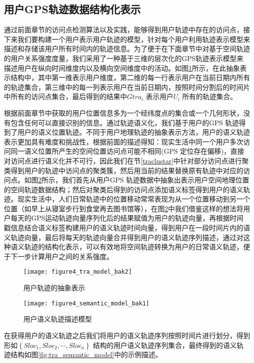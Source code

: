 \subsection{用户GPS轨迹数据结构化表示}
\label{sec:section3-4}
通过前面章节的访问点检测算法以及实践，能够得到用户轨迹中存在的访问点，接下来我们要构建一个用户表示用户轨迹的模型，针对每个用户利用轨迹表示模型来描述和存储该用户所有时间内的轨迹信息。为了便于在下面章节中对基于空间轨迹的用户关系强度度量，我们采用了一种基于三维的层次化的GPS轨迹表示模型来描述用户在纵向时间维度内以及横向空间维度中的活动。如图\ref{fig:tramodel_abstract}所示，在此抽象表示结构中，其中第一维表示用户维度，第二维的每一行表示用户在当前日期内所有的轨迹集合，第三维中的每一列表示用户在当前日期内，按照时间分割后的时间片中所有的访问点集合，最后得到的结果中$Gtra_{i}$ 表示用户$U_{i}$ 所有的轨迹集合。
\par 根据前面章节中获取的用户位置信息多为一个经纬度点的集合或一个几何形状，没有包含任何可以直接识别的信息。通过轨迹语义化，我们基于用户的GPS 轨迹得到了用户的语义位置轨迹。不同于用户地理轨迹的抽象表示方法，用户的语义轨迹表示更加具有难度和挑战性，根据前面的描述得知：现实生活中同一个用户多次访问同一语义位置所产生的空间位置访问点可能不相同(GPS 定位存在偏移)，直接对访问点进行语义化并不可行，因此我们在节\ref{traclustar}中针对部分访问点进行聚类得到用户的轨迹中访问点的聚类簇，然后用当前的结果替换原有轨迹中对应的访问点。如图\ref{fig:semantic_model}所示，我们首先从用户GPS 轨迹数据中抽象出表示用户空间地理位置的空间轨迹数据结构；然后对聚类后得到的访问点添加语义标签得到用户的语义轨迹。现实生活中，人们日常轨迹中的位置移动常常表现为从一个位置移动到另一个位置（如早上从寝室步行到食堂再去图书馆等），在图\ref{fig:semantic_model}中我们借鉴这样的想法将用户每天的GPS运动轨迹向量序列化后的结果赋值为用户的轨迹向量，再根据时间戳信息结合语义标签构建用户的语义轨迹时间向量，得到用户在一段时间片内的语义轨迹向量，最后将每天的轨迹向量合并得到用户的语义轨迹序列描述，通过对这种语义轨迹的结构化表示，可以有效地将空间轨迹转换为用户的日常语义轨迹，便于下一步计算用户之间的关系强度。
\begin{figure}[htp]
\centering
\texttt{[image: figure4\_tra\_model\_bak2]}
\caption{用户轨迹的抽象表示}
\label{fig:tramodel_abstract}
\end{figure}
\begin{figure}[htp]
\centering
\texttt{[image: figure4\_semantic\_model\_bak1]}
\caption{用户语义轨迹描述模型}
\label{fig:semantic_model}
\end{figure}
\par 在获得用户的语义轨迹之后我们将用户的语义轨迹序列按照时间片进行划分，得到形如$\left \{Sloc_{1},Sloc_{2},\cdots ,Sloc_{n} \right \}$ 结构的用户语义轨迹序列集合，最终得到的语义轨迹结构如图\ref{fig:tra_semantic_model}中的示例描述。
